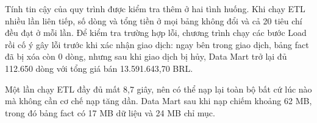 Tính tin cậy của quy trình được kiểm tra thêm ở hai tình huống. Khi chạy ETL nhiều lần liên tiếp, số dòng và tổng tiền ở mọi bảng không đổi và cả 20 tiêu chí đều đạt ở mỗi lần. Để kiểm tra trường hợp lỗi, chương trình  chạy các bước Load rồi cố ý gây lỗi trước khi xác nhận giao dịch: ngay bên trong giao dịch, bảng fact đã bị xóa còn 0 dòng, nhưng sau khi giao dịch bị hủy, Data Mart trở lại đủ 112.650 dòng với tổng giá bán 13.591.643,70 BRL.

Một lần chạy ETL đầy đủ mất 8,7 giây, nên có thể nạp lại toàn bộ bất cứ lúc nào mà không cần cơ chế nạp tăng dần. Data Mart sau khi nạp chiếm khoảng 62 MB, trong đó bảng fact có 17 MB dữ liệu và 24 MB chỉ mục.
